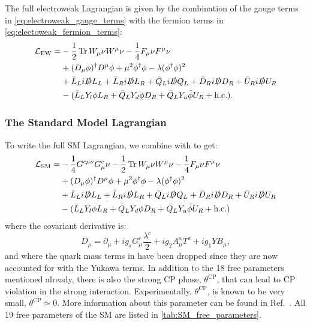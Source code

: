 The full electroweak Lagrangian is given by the combination of the gauge terms in \cref{eq:electroweak_gauge_terms} with the fermion terms in \cref{eq:electoweak_fermion_terms}:
\begin{align}
  \begin{split}
   \mathcal{L}_\mathrm{EW} = &-\frac{1}{2} \operatorname{Tr} W_\mu\nu W^\mu\nu - \frac{1}{4} F_\mu\nu F^\mu\nu \\ 
    &+ (D_\mu \phi)^\dag D^\mu \phi + \mu^2 \phi^\dag \phi - \lambda (\phi^\dag \phi)^2 \\
    &+ \bar{L}_L i \slashed{D} L_L + \bar{L}_R i \slashed{D} L_R + \bar{Q}_L i \slashed{D} Q_L + \bar{D}_R i \slashed{D} D_R + \bar{U}_R i \slashed{D} U_R \\
    &- (\bar{L}_L Y_l \phi L_R + \bar{Q}_L Y_d \phi D_R + \bar{Q}_L Y_u \tilde{\phi} U_R + \text{h.c.}) .
  \end{split}
  \label{eq:ew_lagrangian}
\end{align}

\subsubsection{The Standard Model Lagrangian}
To write the full SM Lagrangian, we combine \LEW with \LQCD to get:
\begin{align}
  \begin{split}
    \mathcal{L}_\mathrm{SM} = &- \frac{1}{4} G^{c\mu\nu} G^c_\mu\nu -\frac{1}{2} \operatorname{Tr} W_\mu\nu W^\mu\nu - \frac{1}{4} F_\mu\nu F^\mu\nu \\ 
    &+ (D_\mu \phi)^\dag D^\mu \phi + \mu^2 \phi^\dag \phi - \lambda (\phi^\dag \phi)^2 \\
    &+ \bar{L}_L i \slashed{D} L_L + \bar{L}_R i \slashed{D} L_R + \bar{Q}_L i \slashed{D} Q_L + \bar{D}_R i \slashed{D} D_R + \bar{U}_R i \slashed{D} U_R \\
    &- (\bar{L}_L Y_l \phi L_R + \bar{Q}_L Y_d \phi D_R + \bar{Q}_L Y_u \tilde{\phi} U_R + \text{h.c.})
  \end{split}
\end{align}
where the covariant derivative is:
\begin{equation}
  D_\mu = \partial_\mu + ig_s G^c_\mu \frac{\lambda^c}{2} + ig_2 A^a_\mu T^a + ig_1 Y B_\mu,
\end{equation}
and where the quark mass terms in \LQCD have been dropped since they are now accounted for with the Yukawa terms. In addition to the 18 free parameters mentioned already, there is also the strong CP phase, $\theta^{\text{CP}}$, that can lead to CP violation in the strong interaction. Experimentally, $\theta^{\text{CP}}$, is known to be very small, $\theta^{\text{CP}} \simeq 0$. More information about this parameter can be found in Ref.~\cite{Wu:1991rw}. All 19 free parameters of the SM are listed in \cref{tab:SM_free_parameters}.

